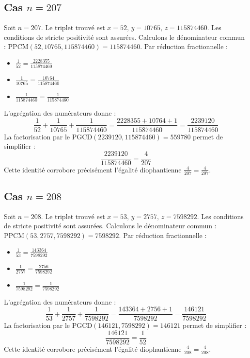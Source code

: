 \documentclass[11pt,a4paper]{article}
\begin{document}
\subsection{Cas $n = 207$}
Soit $n = 207$. Le triplet trouvé est $x = 52$, $y = 10765$, $z = 115874460$.
Les conditions de stricte positivité sont assurées.
Calculons le dénominateur commun : $\text{PPCM}(52, 10765, 115874460) = 115874460$.
Par réduction fractionnelle :
\begin{itemize}
    \item $\frac{1}{52} = \frac{2228355}{115874460}$
    \item $\frac{1}{10765} = \frac{10764}{115874460}$
    \item $\frac{1}{115874460} = \frac{1}{115874460}$
\end{itemize}
L'agrégation des numérateurs donne :
$$ \frac{1}{52} + \frac{1}{10765} + \frac{1}{115874460} = \frac{2228355 + 10764 + 1}{115874460} = \frac{2239120}{115874460} $$
La factorisation par le $\text{PGCD}(2239120, 115874460) = 559780$ permet de simplifier :
$$ \frac{2239120}{115874460} = \frac{4}{207} $$
Cette identité corrobore précisément l'égalité diophantienne $\frac{4}{207} = \frac{4}{207}$.

\subsection{Cas $n = 208$}
Soit $n = 208$. Le triplet trouvé est $x = 53$, $y = 2757$, $z = 7598292$.
Les conditions de stricte positivité sont assurées.
Calculons le dénominateur commun : $\text{PPCM}(53, 2757, 7598292) = 7598292$.
Par réduction fractionnelle :
\begin{itemize}
    \item $\frac{1}{53} = \frac{143364}{7598292}$
    \item $\frac{1}{2757} = \frac{2756}{7598292}$
    \item $\frac{1}{7598292} = \frac{1}{7598292}$
\end{itemize}
L'agrégation des numérateurs donne :
$$ \frac{1}{53} + \frac{1}{2757} + \frac{1}{7598292} = \frac{143364 + 2756 + 1}{7598292} = \frac{146121}{7598292} $$
La factorisation par le $\text{PGCD}(146121, 7598292) = 146121$ permet de simplifier :
$$ \frac{146121}{7598292} = \frac{1}{52} $$
Cette identité corrobore précisément l'égalité diophantienne $\frac{4}{208} = \frac{4}{208}$.
\end{document}
